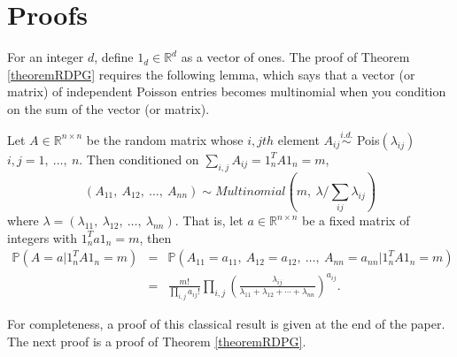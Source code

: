 \documentclass[twoside,11pt]{article}
\begin{document}

\appendix
  \renewcommand{\appendixname}{Appendix~\Alph{section}}

\section{Proofs}
For an integer $d$, define $1_d \in \mathds{R}^d$ as a vector of ones.  The proof of Theorem \ref{theoremRDPG} requires the following lemma, which says that a vector (or matrix) of independent Poisson entries becomes multinomial when you condition on the sum of the vector (or matrix).
\begin{lemma}
\label{lemma1}
Let $A \in \mathds{R}^{n \times n}$ be the random matrix whose $i,j th$ element $A_{ij} \overset{i.d.}{\sim}$ Pois$(\lambda_{ij})$ $i,j=1, \ \dots, \ n$.
Then conditioned on $\sum_{i,j}A_{ij} =  1_n^TA1_n=m$,
\begin{equation*}
(A_{11},\ A_{12},\ \dots,\ A_{nn}) \sim Multinomial(m,\ \lambda / \sum_{ij} \lambda_{ij})
\end{equation*}
where $\lambda = (\lambda_{11},\ \lambda_{12},\ \dots,\ \lambda_{nn})$.  That is, let $a\in \mathds{R}^{n \times n}$ be a fixed matrix of integers with $1_n^Ta1_n=m$, then
\begin{eqnarray*}
\mathbb{P}(A = a|1_n^T A 1_n = m)&=&\mathbb{P}(A_{11} = a_{11}, \ A_{12} = a_{12},\ \dots,\ A_{nn} = a_{nn}|1_n^T A 1_n = m) \\
&=&  \frac{m!}{\prod_{i,j}a_{ij}!} \prod_{i,j} \left(\frac{\lambda_{ij}}{\lambda_{11} + \lambda_{12}+\cdots +\lambda_{nn}} \right)^{a_{ij}}.
\end{eqnarray*}
\end{lemma}

\vspace{.2 in}

For completeness, a proof of this classical result is given at the end of the paper. The next proof is a proof of Theorem \ref{theoremRDPG}.

\vspace{.2 in}
\end{document}

